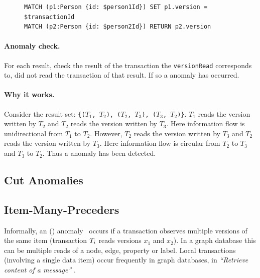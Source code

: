 \begin{figure}
\begin{lstlisting}[language=cypher,label=fig:cif1,caption=\tx{G1c $T_\mathrm{RW}$}.]
MATCH (p1:Person {id: $person1Id}) SET p1.version = $transactionId
MATCH (p2:Person {id: $person2Id}) RETURN p2.version
\end{lstlisting}
\end{figure}

\paragraph{Anomaly check.}
For each result, check the result of the transaction the \texttt{versionRead} corresponds to, did not read the transaction of that result.
If so a  anomaly has occurred.

\paragraph{Why it works.}
Consider the result set:
\texttt{\{($T_\mathrm{1}$, $T_\mathrm{2}$), ($T_\mathrm{2}$, $T_\mathrm{3}$), ($T_\mathrm{3}$, $T_\mathrm{2}$)\}}.
$T_\mathrm{1}$ reads the version written by $T_\mathrm{2}$ and $T_\mathrm{2}$  reads the version written by $T_\mathrm{3}$.
Here information flow is unidirectional from $T_\mathrm{1}$ to $T_\mathrm{2}$.
However, $T_\mathrm{2}$ reads the version written by $T_\mathrm{3}$ and $T_\mathrm{2}$  reads the version written by $T_\mathrm{3}$.
Here information flow is circular from $T_\mathrm{2}$ to $T_\mathrm{3}$ and $T_\mathrm{3}$ to $T_\mathrm{2}$.
Thus a  anomaly has been detected.


\subsection{Cut Anomalies}

\subsection*{Item-Many-Preceders}
\label{sec:cut-anomalies}

Informally, an  () anomaly~\cite{DBLP:journals/pvldb/BailisDFGHS13} occurs if a transaction observes multiple versions of the same item (\eg transaction $T_i$ reads versions $x_1$ and $x_2$).
In a graph database this can be multiple reads of a node, edge, property or label.
Local transactions (involving a single data item) occur frequently in graph databases, \eg in \emph{``Retrieve content of a message''} .

